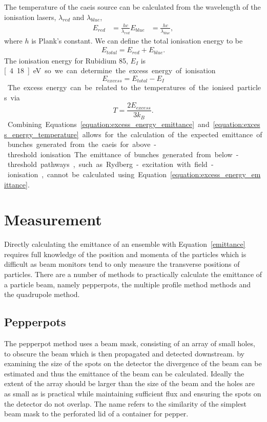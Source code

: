 The temperature of the \gls{caeis} source can be calculated from the wavelength of the ionisation lasers, $\lambda_{red}$ and $\lambda_{blue}$,
\begin{align}
 E_{red} &= \frac{hc}{\lambda_{red}} E_{blue} &= \frac{hc}{\lambda_{blue}},
\end{align}
where $h$ is Plank's constant.
We can define the total ionisation energy to be
\begin{align}
E_{total} = E_{red} + E_{blue}.
\end{align}
The ionisation energy for Rubidium 85, $E_I$ is \unit[4.18]{eV} so we can determine the excess energy of ionisation
\begin{equation}
E_{excess} = E_{total} - E_I
\end{equation}

The excess energy can be related to the temperatures of the ionised particles via
\begin{equation}\label{equation:excess_energy_temperature}
T = \frac{2 E_{excess}}{3 k_B}.
\end{equation}
Combining Equations \ref{equation:excess_energy_emittance} and \ref{equation:excess_energy_temperature} allows for the calculation of the expected emittance of bunches generated from the \gls{caeis} for above-threshold ionisation.
The emittance of bunches generated from below-threshold pathways, such as Rydberg-excitation with field-ionisation, cannot be calculated using Equation~\ref{equation:excess_energy_emittance}.

\section{Measurement}

Directly calculating the emittance of an ensemble with Equation~\ref{emittance} requires full knowledge of the position and momenta of the particles which is difficult as beam monitors tend to only measure the transverse positions of particles.
There are a number of methods to practically calculate the emittance of a particle beam, namely pepperpots, the multiple profile method methods and the quadrupole method.

\subsection{Pepperpots}

The pepperpot method uses a beam mask, consisting of an array of small holes, to obscure the beam which is then propagated and detected downstream.
by examining the size of the spots on the detector the divergence of the beam can be estimated and thus the emittance of the beam can be calculated.
Ideally the extent of the array should be larger than the size of the beam and the holes are as small as is practical while maintaining sufficient flux and ensuring the spots on the detector do not overlap.
The name refers to the similarity of the simplest beam mask to the perforated lid of a container for pepper.

